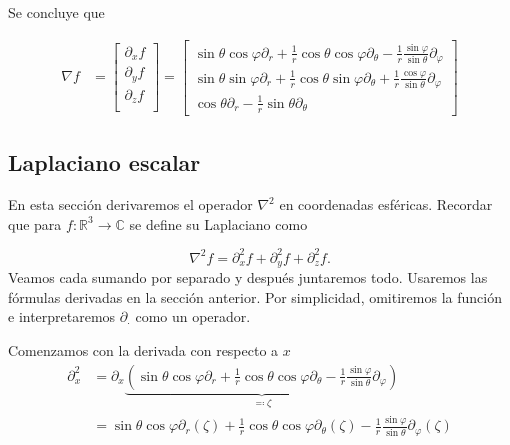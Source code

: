 \documentclass[11pt]{article}
\numberwithin{equation}{section}
\def\R{\mathbb{R}}
\def\C{\mathbb{C}}
\begin{document}
Se concluye que

\begin{align}\label{ap:esfericas:nabla}
	\nabla f
	&=
	\begin{bmatrix}
		\partial_{x} f \\[2pt]
		\partial_{y} f \\[2pt]
		\partial_{z} f \\[2pt]
	\end{bmatrix}
	=
	\begin{bmatrix}
	\sin\theta\cos\varphi \partial_{r}
	+\frac{1}{r} \cos\theta\cos\varphi \partial_{\theta}
	-\frac{1}{r} \frac{\sin\varphi}{\sin\theta} \partial_{\varphi}
	\\[2pt]
	\sin\theta\sin\varphi \partial_{r}
	+\frac{1}{r} \cos\theta\sin\varphi \partial_{\theta}
	+\frac{1}{r} \frac{\cos\varphi}{\sin\theta} \partial_{\varphi}
	\\[2pt]
	\cos\theta \partial_{r}
	-\frac{1}{r} \sin\theta \partial_{\theta}
	\end{bmatrix}
\end{align}

\subsection{Laplaciano escalar}%
\label{ap:esfericas:laplaciano}

En esta sección derivaremos el operador \(\nabla^2\) en coordenadas esféricas. Recordar que para
\(f\colon \R^3 \to \C\) se define su Laplaciano como

\begin{equation}
	\nabla^2 f = \partial^2_{x} f + \partial^2_{y} f + \partial^2_{z} f
.\end{equation}
Veamos cada sumando por separado y después juntaremos todo. Usaremos las
fórmulas derivadas en la sección anterior. Por simplicidad, omitiremos la
función e interpretaremos \(\partial_{\cdot}\) como un operador.

Comenzamos con la derivada con respecto a \(x\)
\begin{align*}
	\partial^2_{x}
	&=
	\partial_{x}
	\underbrace{
	\left(
		\sin\theta\cos\varphi \partial_{r}
		+
		\frac{1}{r} \cos\theta\cos\varphi \partial_{\theta}
		-
		\frac{1}{r} \frac{\sin\varphi}{\sin\theta} \partial_{\varphi}
	\right)
	}_{\eqqcolon \zeta}
	\\&=
	\sin\theta\cos\varphi \partial_{r}(\zeta)
	+
	\frac{1}{r} \cos\theta\cos\varphi \partial_{\theta} (\zeta)
	-
	\frac{1}{r} \frac{\sin\varphi}{\sin\theta} \partial_{\varphi} (\zeta)
\end{align*}
\end{document}
